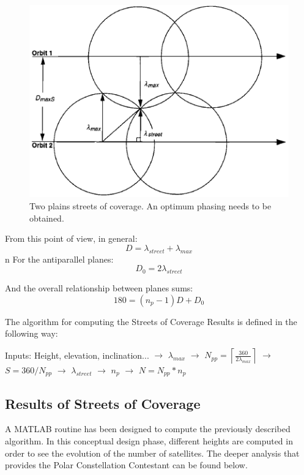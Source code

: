 \begin{figure}[H]
\begin{center}
\includegraphics[scale=0.7]{PolarOrbits/planeseps.png}
\caption[Two plains streets of coverage. An optimum phasing needs to be obtained]{Two plains streets of coverage. An optimum phasing needs to be obtained.\cite{ccar}}
\end{center}
\end{figure}

From this point of view, in general:
$$D = \lambda_{street} + \lambda_{max}$$
n
For the antiparallel planes:
$$D_{0} = 2\lambda_{street}$$

And the overall relationship between planes sums:
$$180 = (n_{p}-1)D + D_{0}$$

The algorithm for computing the Streets of Coverage Results is defined in the following way:

\begin{center}
Inputs: Height, elevation, inclination... 
$\rightarrow$
$\lambda_{max}$
$\rightarrow$
$N_{pp}=\left \lceil \frac{360}{2 \lambda_{max}}  \right \rceil$
$\rightarrow$
\newline
$S=360/N_{pp}$
$\rightarrow$
$\lambda_{street}$
$\rightarrow$
$n_{p}$
$\rightarrow$
$N=N_{pp}*n_{p}$
\end{center}

\subsection{Results of Streets of Coverage}
A MATLAB routine has been designed to compute the previously described algorithm. In this conceptual design phase, different heights are computed in order to see the evolution of the number of satellites. The deeper analysis that provides the Polar Constellation Contestant can be found below.

